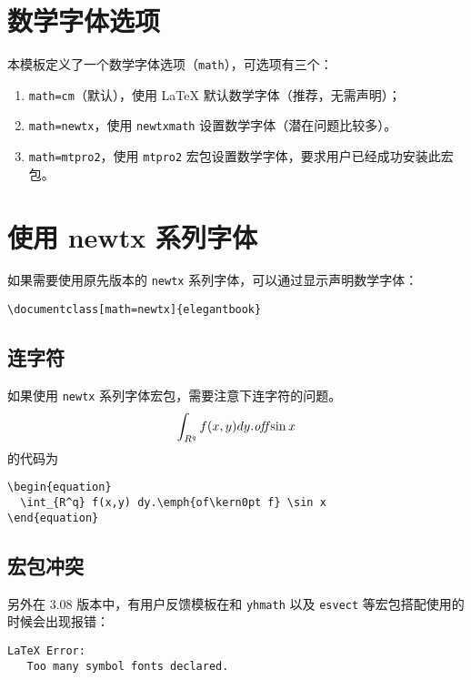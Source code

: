 \documentclass[lang=cn,newtx,10pt,scheme=chinese,color=black]{elegantbook}
\begin{document}
\section{数学字体选项}

本模板定义了一个数学字体选项（\lstinline{math}），可选项有三个：
\begin{enumerate}
  \item \lstinline{math=cm}（默认），使用 \LaTeX{} 默认数学字体（推荐，无需声明）；
  \item \lstinline{math=newtx}，使用 \lstinline{newtxmath} 设置数学字体（潜在问题比较多）。
  \item \lstinline{math=mtpro2}，使用 \lstinline{mtpro2} 宏包设置数学字体，要求用户已经成功安装此宏包。
\end{enumerate}

\section{使用 newtx 系列字体}

如果需要使用原先版本的 \lstinline{newtx} 系列字体，可以通过显示声明数学字体：

\begin{lstlisting}
\documentclass[math=newtx]{elegantbook}
\end{lstlisting}

\subsection{连字符}

如果使用 \lstinline{newtx} 系列字体宏包，需要注意下连字符的问题。
\begin{equation}
  \int_{R^q} f(x,y) dy.\emph{of\kern0pt f} \sin x
\end{equation}
的代码为
\begin{lstlisting}
\begin{equation}
  \int_{R^q} f(x,y) dy.\emph{of\kern0pt f} \sin x
\end{equation}
\end{lstlisting}

\subsection{宏包冲突}

另外在 3.08 版本中，有用户反馈模板在和 \lstinline{yhmath} 以及 \lstinline{esvect} 等宏包搭配使用的时候会出现报错：
\begin{lstlisting}
LaTeX Error:
   Too many symbol fonts declared.
\end{lstlisting}
\end{document}
